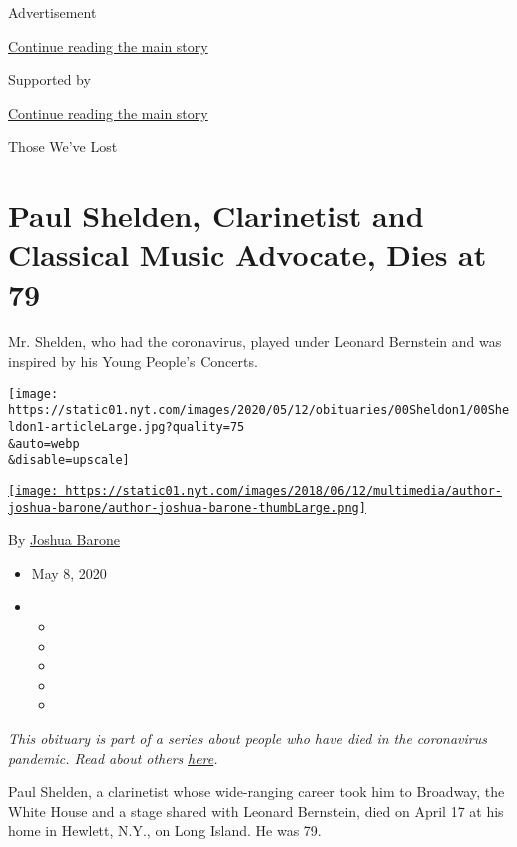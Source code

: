Advertisement

\protect\hyperlink{after-top}{Continue reading the main story}

Supported by

\protect\hyperlink{after-sponsor}{Continue reading the main story}

Those We've Lost

\hypertarget{paul-shelden-clarinetist-and-classical-music-advocate-dies-at-79}{%
\section{Paul Shelden, Clarinetist and Classical Music Advocate, Dies at
79}\label{paul-shelden-clarinetist-and-classical-music-advocate-dies-at-79}}

Mr. Shelden, who had the coronavirus, played under Leonard Bernstein and
was inspired by his Young People's Concerts.

\texttt{[image: https://static01.nyt.com/images/2020/05/12/obituaries/00Sheldon1/00Sheldon1-articleLarge.jpg?quality=75\\\&auto=webp\\\&disable=upscale]}

\href{https://www.nytimes.com/by/joshua-barone}{\texttt{[image: https://static01.nyt.com/images/2018/06/12/multimedia/author-joshua-barone/author-joshua-barone-thumbLarge.png]}}

By \href{https://www.nytimes.com/by/joshua-barone}{Joshua Barone}

\begin{itemize}
\item
  May 8, 2020
\item
  \begin{itemize}
  \item
  \item
  \item
  \item
  \item
  \end{itemize}
\end{itemize}

\emph{This obituary is part of a series about people who have died in
the coronavirus pandemic. Read about others}
\href{https://www.nytimes.com/series/people-who-have-died-of-the-coronavirus}{\emph{here}}\emph{.}

Paul Shelden, a clarinetist whose wide-ranging career took him to
Broadway, the White House and a stage shared with Leonard Bernstein,
died on April 17 at his home in Hewlett, N.Y., on Long Island. He was
79.


